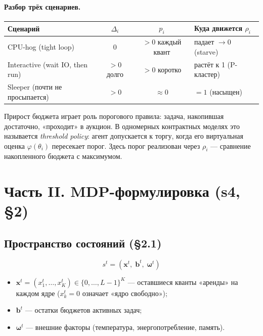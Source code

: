 \documentclass[11pt,a4paper]{article}
\begin{document}
\paragraph{Разбор трёх сценариев.}
\begin{center}\small
\begin{tabular}{@{}lccl@{}}
\toprule
Сценарий & $\Delta_i$ & $p_i$ & Куда движется $\rho_i$\\
\midrule
CPU-hog (tight loop)           & 0         & $>0$ каждый квант & падает $\to 0$ (starve)\\
Interactive (wait IO, then run) & $>0$ долго & $>0$ коротко & растёт к 1 (P-кластер)\\
Sleeper (почти не просыпается) & $>0$      & $\approx 0$ & $=1$ (насыщен)\\
\bottomrule
\end{tabular}
\end{center}

\begin{why}
Прирост бюджета играет роль порогового правила: задача,
накопившая достаточно, «проходит» в аукцион. В одномерных
контрактных моделях это называется \emph{threshold policy}:
агент допускается к торгу, когда его виртуальная оценка
$\varphi(\theta_i)$ пересекает порог. Здесь порог реализован
через $\rho_i$ — сравнение накопленного бюджета с максимумом.
\end{why}

\section{Часть II. MDP-формулировка (s4, §2)}

\subsection{Пространство состояний (§2.1)}

\[
s^t = (\mathbf{x}^t,\; \mathbf{b}^t,\; \boldsymbol{\omega}^t)
\]
\begin{itemize}
  \item $\mathbf{x}^t=(x_1^t,\ldots,x_K^t)\in\{0,\ldots,L{-}1\}^K$ —
    оставшиеся кванты «аренды» на каждом ядре ($x_k^t=0$ означает
    «ядро свободно»);
  \item $\mathbf{b}^t$ — остатки бюджетов активных задач;
  \item $\boldsymbol{\omega}^t$ — внешние факторы (температура,
    энергопотребление, память).
\end{itemize}
\end{document}
